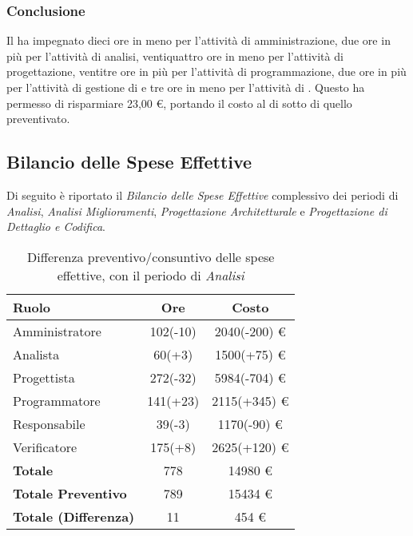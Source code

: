 \subsubsection{Conclusione}
Il  ha impegnato dieci ore in meno per l'attivit\`a di amministrazione, due ore in pi\`u per l'attivit\`a di analisi, ventiquattro ore in meno per l'attivit\`a di progettazione, ventitre ore in pi\`u per l'attivit\`a di programmazione, due ore in pi\`u per l'attivit\`a di gestione di  e tre ore in meno per l'attivit\`a di . Questo ha permesso di risparmiare 23,00 \euro{}, portando il costo  al di sotto di quello preventivato.


\subsection{Bilancio delle Spese Effettive}
Di seguito \`e riportato il \textit{Bilancio delle Spese Effettive} complessivo dei periodi di \textit{Analisi}, \textit{Analisi Miglioramenti}, \textit{Progettazione Architetturale} e \textit{Progettazione di Dettaglio e Codifica}.

\begin{table}[H]
	\centering
	\begin{tabular}{ l c c }
		\textbf{Ruolo} & \textbf{Ore} & \textbf{Costo} \\
		\hline
		Amministratore & 102(-10) & 2040(-200) \euro{} \\
		Analista & 60(+3) & 1500(+75) \euro{} \\
		Progettista & 272(-32) & 5984(-704) \euro{} \\
		Programmatore & 141(+23) & 2115(+345) \euro{} \\
		Responsabile & 39(-3) & 1170(-90) \euro{} \\
		Verificatore & 175(+8) & 2625(+120) \euro{} \\
		\hline
		\textbf{Totale \glossaryItem{Consuntivo}} & 778 & 14980 \euro{} \\
		\hline
		\textbf{Totale Preventivo} & 789 & 15434 \euro{} \\
		\hline
		\textbf{Totale (Differenza)} & 11 & 454 \euro{} \\
		\hline
	\end{tabular}
	\caption{Differenza preventivo/consuntivo delle spese effettive, con il periodo di \textit{Analisi}}
\end{table}

